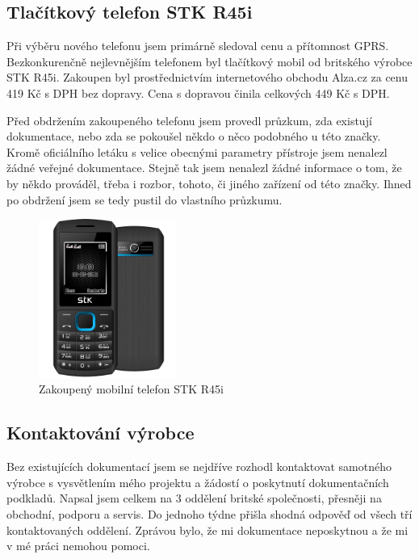 \documentclass[FM,DP]{tulthesis}  %
\begin{document}
\subsection{Tlačítkový telefon STK R45i}
Při výběru nového telefonu jsem primárně sledoval cenu a přítomnost GPRS. Bezkonkurenčně nejlevnějším telefonem byl tlačítkový mobil od britského výrobce STK R45i. Zakoupen byl prostřednictvím internetového obchodu Alza.cz za cenu 419 Kč s DPH bez dopravy. Cena s dopravou činila celkových 449 Kč s DPH.

Před obdržením zakoupeného telefonu jsem provedl průzkum, zda existují dokumentace, nebo zda se pokoušel někdo o něco podobného u této značky. Kromě oficiálního letáku s velice obecnými parametry přístroje jsem nenalezl žádné veřejné dokumentace. Stejně tak jsem nenalezl žádné informace o tom, že by někdo prováděl, třeba i rozbor, tohoto, či jiného zařízení od této značky. Ihned po obdržení jsem se tedy pustil do vlastního průzkumu.

\begin{figure}[H]
\begin{center}
\includegraphics[width=0.4\textwidth]{images/phone.png}
\caption{Zakoupený mobilní telefon STK R45i}
\label{image}
\end{center}
\end{figure}

\subsection{Kontaktování výrobce}
Bez existujících dokumentací jsem se nejdříve rozhodl kontaktovat samotného výrobce s vysvětlením mého projektu a žádostí o poskytnutí dokumentačních podkladů. Napsal jsem celkem na 3 oddělení britské společnosti, přesněji na obchodní, podporu a servis. Do jednoho týdne přišla shodná odpověď od všech tří kontaktovaných oddělení. Zprávou bylo, že mi dokumentace neposkytnou a že mi v mé práci nemohou pomoci.
\end{document}
